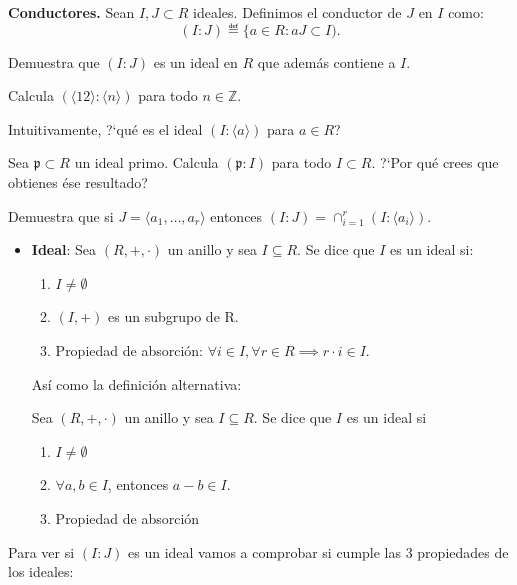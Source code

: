 \begin{problem}
{\bfseries Conductores.}
Sean $I, J\subset R$ ideales. Definimos el conductor de $J$ en $I$  como:
$$(I:J) ≝\{a\in R: aJ\subset I).$$

\ppart Demuestra que $(I:J)$ es un ideal en $R$ que además contiene a $I$.

\ppart Calcula $(\langle 12\rangle : \langle n \rangle)$ para todo  $n\in {\mathbb Z}$.

\ppart Intuitivamente,  ?`qué es el ideal $(I: \langle a\rangle)$ para $a\in R$?

\ppart Sea ${\mathfrak p}\subset R$ un ideal primo. Calcula $({\mathfrak p}: I)$ para todo $I\subset R$.
?`Por qué crees que obtienes ése   resultado?

\ppart Demuestra que si $J=\langle a_1,\ldots, a_r\rangle$ entonces $(I:J)=\cap_{i=1}^r(I: \langle a_i\rangle).$

\solution

\spart


\begin{defToUse}
	\begin{itemize}
		\item \textbf{Ideal}: Sea $(R,+,\cdot)$ un anillo y sea $I \subseteq R$. Se dice que $I$ es un ideal si:
		\begin{enumerate}
			\item $I \neq \emptyset$
			\item $(I, +)$ es un subgrupo de R.
			\item Propiedad de absorción: $\forall i \in I, \forall r \in R \implies r\cdot i \in I$.
		\end{enumerate}

		Así como la definición alternativa:

		Sea $(R,+,\cdot)$ un anillo y sea $I \subseteq R$. Se dice que $I$ es un ideal si
		\begin{enumerate}
			\item $I \neq \emptyset$
			\item $\forall a,b \in I$, entonces $a-b \in I$.
			\item Propiedad de absorción
		\end{enumerate}
	\end{itemize}
\end{defToUse}

Para ver si $(I:J)$ es un ideal vamos a comprobar si cumple las 3 propiedades de los ideales:


\end{problem}
